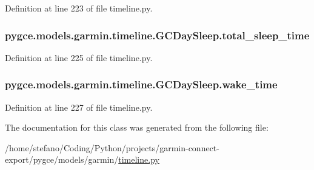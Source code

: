 Definition at line 223 of file timeline.\+py.

\subsubsection[{\texorpdfstring{total\+\_\+sleep\+\_\+time}{total_sleep_time}}]{\setlength{\rightskip}{0pt plus 5cm}pygce.\+models.\+garmin.\+timeline.\+G\+C\+Day\+Sleep.\+total\+\_\+sleep\+\_\+time}\hypertarget{classpygce_1_1models_1_1garmin_1_1timeline_1_1_g_c_day_sleep_a4942fa038d25a7af4c0793da1b3abf86}{}\label{classpygce_1_1models_1_1garmin_1_1timeline_1_1_g_c_day_sleep_a4942fa038d25a7af4c0793da1b3abf86}


Definition at line 225 of file timeline.\+py.

\subsubsection[{\texorpdfstring{wake\+\_\+time}{wake_time}}]{\setlength{\rightskip}{0pt plus 5cm}pygce.\+models.\+garmin.\+timeline.\+G\+C\+Day\+Sleep.\+wake\+\_\+time}\hypertarget{classpygce_1_1models_1_1garmin_1_1timeline_1_1_g_c_day_sleep_abb2351f921e38ff370e1ad0822957553}{}\label{classpygce_1_1models_1_1garmin_1_1timeline_1_1_g_c_day_sleep_abb2351f921e38ff370e1ad0822957553}


Definition at line 227 of file timeline.\+py.



The documentation for this class was generated from the following file\+:\begin{DoxyCompactItemize}
\item 
/home/stefano/\+Coding/\+Python/projects/garmin-\/connect-\/export/pygce/models/garmin/\hyperlink{timeline_8py}{timeline.\+py}\end{DoxyCompactItemize}
